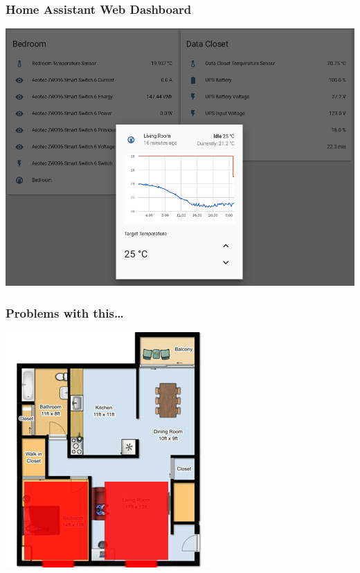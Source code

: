 \documentclass[aspectratio=169,11pt,hyperref={colorlinks=true}]{beamer}
\begin{document}
\begin{frame}
    \frametitle{Home Assistant Web Dashboard}
    \begin{center}
        \includegraphics[width=.75\textwidth]{Control_panel_trimmed.png}
    \end{center}
\end{frame}

\begin{frame}
    \frametitle{Problems with this\dots}
    \begin{center}
    \includegraphics[height=.85\textheight]{floorplan-zones.png}
    \end{center}
\end{frame}
\end{document}
